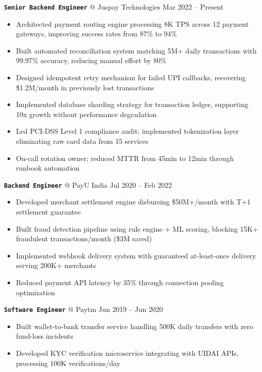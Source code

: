 \documentclass[10pt,a4paper]{article}
\begin{document}
\textbf{\texttt{Senior Backend Engineer}} @ Juspay Technologies \hfill {\small\color{accent} Mar 2022 -- Present}
\begin{itemize}
    \item Architected payment routing engine processing 8K TPS across 12 payment gateways, improving success rates from 87\% to 94\%
    \item Built automated reconciliation system matching 5M+ daily transactions with 99.97\% accuracy, reducing manual effort by 80\%
    \item Designed idempotent retry mechanism for failed UPI callbacks, recovering \$1.2M/month in previously lost transactions
    \item Implemented database sharding strategy for transaction ledger, supporting 10x growth without performance degradation
    \item Led PCI-DSS Level 1 compliance audit; implemented tokenization layer eliminating raw card data from 15 services
    \item On-call rotation owner; reduced MTTR from 45min to 12min through runbook automation
\end{itemize}

\textbf{\texttt{Backend Engineer}} @ PayU India \hfill {\small\color{accent} Jul 2020 -- Feb 2022}
\begin{itemize}
    \item Developed merchant settlement engine disbursing \$50M+/month with T+1 settlement guarantee
    \item Built fraud detection pipeline using rule engine + ML scoring, blocking 15K+ fraudulent transactions/month (\$3M saved)
    \item Implemented webhook delivery system with guaranteed at-least-once delivery serving 200K+ merchants
    \item Reduced payment API latency by 35\% through connection pooling optimization
\end{itemize}

\textbf{\texttt{Software Engineer}} @ Paytm \hfill {\small\color{accent} Jun 2019 -- Jun 2020}
\begin{itemize}
    \item Built wallet-to-bank transfer service handling 500K daily transfers with zero fund-loss incidents
    \item Developed KYC verification microservice integrating with UIDAI APIs, processing 100K verifications/day
\end{itemize}
\end{document}
